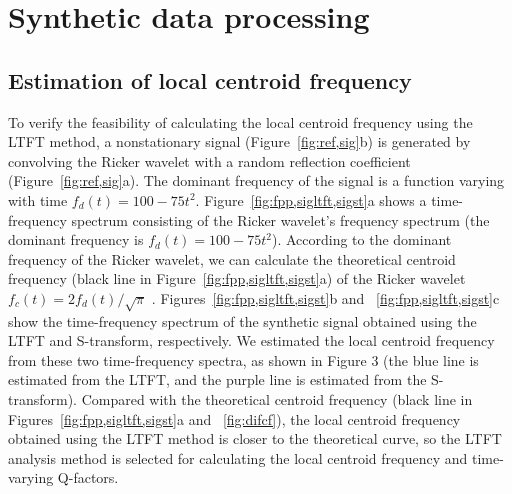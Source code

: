 \section{Synthetic data processing}

\subsection{Estimation of local centroid frequency}

To verify the feasibility of calculating the local centroid frequency
using the LTFT method, a nonstationary signal
(Figure~\ref{fig:ref,sig}b) is generated by convolving the Ricker
wavelet with a random reflection coefficient
(Figure~\ref{fig:ref,sig}a). The dominant frequency of the signal is a
function varying with time $f_d(t)=100-75t^2$.
Figure~\ref{fig:fpp,sigltft,sigst}a shows a time-frequency spectrum
consisting of the Ricker wavelet’s frequency spectrum (the dominant
frequency is $f_d(t)=100-75t^2$). According to the dominant frequency
of the Ricker wavelet, we can calculate the theoretical centroid
frequency (black line in Figure~\ref{fig:fpp,sigltft,sigst}a) of the
Ricker wavelet $f_c(t)=2f_d(t)/\surd{\pi}$ \cite[]{Hu13}.
Figures~\ref{fig:fpp,sigltft,sigst}b and ~\ref{fig:fpp,sigltft,sigst}c
show the time-frequency spectrum of the synthetic signal obtained
using the LTFT and S-transform, respectively. We estimated the local
centroid frequency from these two time-frequency spectra, as shown in
Figure 3 (the blue line is estimated from the LTFT, and the purple
line is estimated from the S-transform). Compared with the theoretical
centroid frequency (black line in Figures~\ref{fig:fpp,sigltft,sigst}a
and ~\ref{fig:difcf}), the local centroid frequency obtained using the
LTFT method is closer to the theoretical curve, so the LTFT analysis
method is selected for calculating the local centroid frequency and
time-varying Q-factors.


